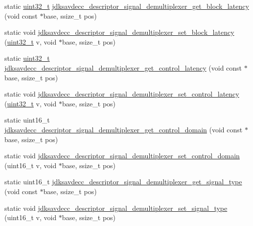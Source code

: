 \begin{DoxyCompactItemize}
\item 
static \hyperlink{parse_8c_a6eb1e68cc391dd753bc8ce896dbb8315}{uint32\+\_\+t} \hyperlink{group__descriptor__signal__demultiplexer_gab898ca71605465944a08b3154adb9895}{jdksavdecc\+\_\+descriptor\+\_\+signal\+\_\+demultiplexer\+\_\+get\+\_\+block\+\_\+latency} (void const $\ast$base, ssize\+\_\+t pos)
\item 
static void \hyperlink{group__descriptor__signal__demultiplexer_ga0f3b4797ca3ea60a013a86db93ccf69f}{jdksavdecc\+\_\+descriptor\+\_\+signal\+\_\+demultiplexer\+\_\+set\+\_\+block\+\_\+latency} (\hyperlink{parse_8c_a6eb1e68cc391dd753bc8ce896dbb8315}{uint32\+\_\+t} v, void $\ast$base, ssize\+\_\+t pos)
\item 
static \hyperlink{parse_8c_a6eb1e68cc391dd753bc8ce896dbb8315}{uint32\+\_\+t} \hyperlink{group__descriptor__signal__demultiplexer_gaf872311671b5eb131352eda97c644d97}{jdksavdecc\+\_\+descriptor\+\_\+signal\+\_\+demultiplexer\+\_\+get\+\_\+control\+\_\+latency} (void const $\ast$base, ssize\+\_\+t pos)
\item 
static void \hyperlink{group__descriptor__signal__demultiplexer_ga995dc35c5c1805f4ca53c5c1dec27cdf}{jdksavdecc\+\_\+descriptor\+\_\+signal\+\_\+demultiplexer\+\_\+set\+\_\+control\+\_\+latency} (\hyperlink{parse_8c_a6eb1e68cc391dd753bc8ce896dbb8315}{uint32\+\_\+t} v, void $\ast$base, ssize\+\_\+t pos)
\item 
static uint16\+\_\+t \hyperlink{group__descriptor__signal__demultiplexer_gaba227a20ae1cf99c4a6065852922698f}{jdksavdecc\+\_\+descriptor\+\_\+signal\+\_\+demultiplexer\+\_\+get\+\_\+control\+\_\+domain} (void const $\ast$base, ssize\+\_\+t pos)
\item 
static void \hyperlink{group__descriptor__signal__demultiplexer_ga34df93148694894967b3538164ea4a50}{jdksavdecc\+\_\+descriptor\+\_\+signal\+\_\+demultiplexer\+\_\+set\+\_\+control\+\_\+domain} (uint16\+\_\+t v, void $\ast$base, ssize\+\_\+t pos)
\item 
static uint16\+\_\+t \hyperlink{group__descriptor__signal__demultiplexer_ga3c41b6de1026362116f07d674b761617}{jdksavdecc\+\_\+descriptor\+\_\+signal\+\_\+demultiplexer\+\_\+get\+\_\+signal\+\_\+type} (void const $\ast$base, ssize\+\_\+t pos)
\item 
static void \hyperlink{group__descriptor__signal__demultiplexer_ga92c10f7f8dc049b48f5de23dd903d5dc}{jdksavdecc\+\_\+descriptor\+\_\+signal\+\_\+demultiplexer\+\_\+set\+\_\+signal\+\_\+type} (uint16\+\_\+t v, void $\ast$base, ssize\+\_\+t pos)
\item 

\end{DoxyCompactItemize}
